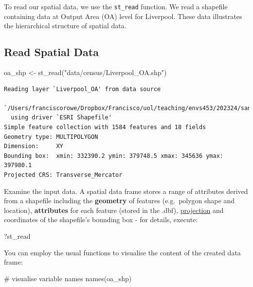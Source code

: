 \documentclass[
  letterpaper,
  DIV=11,
  numbers=noendperiod,
  oneside]{scrreprt}
\newenvironment{Shaded}{\begin{snugshade}}{\end{snugshade}}
\newcommand{\CommentTok}[1]{\textcolor[rgb]{0.37,0.37,0.37}{#1}}
\newcommand{\FunctionTok}[1]{\textcolor[rgb]{0.28,0.35,0.67}{#1}}
\newcommand{\NormalTok}[1]{\textcolor[rgb]{0.00,0.23,0.31}{#1}}
\newcommand{\OtherTok}[1]{\textcolor[rgb]{0.00,0.23,0.31}{#1}}
\newcommand{\StringTok}[1]{\textcolor[rgb]{0.13,0.47,0.30}{#1}}
\begin{document}
To read our spatial data, we use the \texttt{st\_read} function. We read
a shapefile containing data at Output Area (OA) level for Liverpool.
These data illustrates the hierarchical structure of spatial data.

\subsection{Read Spatial Data}\label{read-spatial-data}

\begin{Shaded}
\begin{Highlighting}[]
\NormalTok{oa\_shp }\OtherTok{\textless{}{-}} \FunctionTok{st\_read}\NormalTok{(}\StringTok{"data/census/Liverpool\_OA.shp"}\NormalTok{)}
\end{Highlighting}
\end{Shaded}

\begin{verbatim}
Reading layer `Liverpool_OA' from data source 
  `/Users/franciscorowe/Dropbox/Francisco/uol/teaching/envs453/202324/san/data/census/Liverpool_OA.shp' 
  using driver `ESRI Shapefile'
Simple feature collection with 1584 features and 18 fields
Geometry type: MULTIPOLYGON
Dimension:     XY
Bounding box:  xmin: 332390.2 ymin: 379748.5 xmax: 345636 ymax: 397980.1
Projected CRS: Transverse_Mercator
\end{verbatim}

Examine the input data. A spatial data frame stores a range of
attributes derived from a shapefile including the \textbf{geometry} of
features (e.g.~polygon shape and location), \textbf{attributes} for each
feature (stored in the .dbf),
\href{https://en.wikipedia.org/wiki/Map_projection}{projection} and
coordinates of the shapefile's bounding box - for details, execute:

\begin{Shaded}
\begin{Highlighting}[]
\NormalTok{?st\_read}
\end{Highlighting}
\end{Shaded}

You can employ the usual functions to visualise the content of the
created data frame:

\begin{Shaded}
\begin{Highlighting}[]
\CommentTok{\# visualise variable names}
\FunctionTok{names}\NormalTok{(oa\_shp)}
\end{Highlighting}
\end{Shaded}
\end{document}
